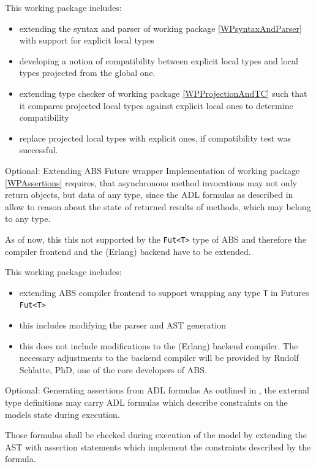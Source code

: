 \documentclass[paper=a4,nochapname,accentcolor=tud9c]{tudexercise}
\makeatletter
\def\namedlabel#1#2{\begingroup
    #1%
    \def\@currentlabel{\thedescriptcount}%
    \phantomsection\label{#2}\endgroup
}
\newcounter{descriptcount}
\renewcommand*\thedescriptcount{[\Alph{descriptcount}]}}
\renewcommand*\thedescriptcount{\roman{descriptcount}}}
\makeatother
\begin{document}
\begin{enumdescript}
    This working package includes:
    \begin{itemize}
      \item extending the syntax and parser of working package \ref{WPsyntaxAndParser}
        with support for explicit local types
      \item developing a notion of compatibility between explicit local types
        and local types projected from the global one.
      \item extending type checker of working package \ref{WPProjectionAndTC} such
        that it compares projected local types against explicit local ones to
        determine compatibility
      \item replace projected local types with explicit ones, if compatibility
        test was successful.
    \end{itemize}
  \item[\namedlabel{Optional: Extending ABS Future wrapper}{WPAnyFut}]%
    Implementation of working package \ref{WPAssertions} requires, that asynchronous method
    invocations may not only return objects, but data of any type, since the ADL
    formulas as described in \cite{kamburjan2018stateful} allow to reason about the state of returned results of methods, which may belong to any type.

    As of now, this this not supported by the \texttt{Fut<T>} type of ABS and
    therefore the compiler frontend and the (Erlang) backend have to be extended.

    This working package includes:
    \begin{itemize}
      \item extending ABS compiler frontend to support wrapping any type
        \texttt{T} in Futures \texttt{Fut<T>}
      \item this includes modifying the parser and AST generation
        \item this does not include modifications to the (Erlang) backend
          compiler. The necessary adjustments to the backend compiler will be
          provided by Rudolf Schlatte, PhD, one of the core developers of ABS.
    \end{itemize}
  \item[\namedlabel{Optional: Generating assertions from ADL formulas}{WPAssertions}]%
    As outlined in \cite{kamburjan2018stateful}, the external type definitions
    may carry ADL formulas which describe constraints on the models state during 
    execution.

    Those formulas shall be checked during execution of the model by extending
    the AST with assertion statements \cite{absassertions} which implement the
    constraints described by the formula.


\end{enumdescript}
\end{document}
